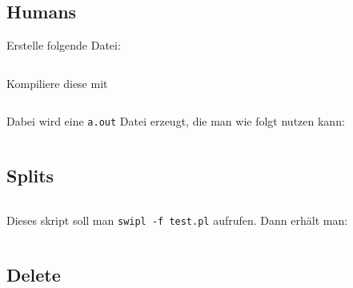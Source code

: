 \subsection{Humans}
Erstelle folgende Datei:
\inputminted[linenos, numbersep=5pt, tabsize=4, frame=lines, label=human.pro]{prolog}{scripts/prolog/human.pro}

Kompiliere diese mit
\inputminted[numbersep=5pt, tabsize=4]{bash}{scripts/prolog/human.sh}

Dabei wird eine \texttt{a.out} Datei erzeugt, die man wie folgt
nutzen kann:
\inputminted[numbersep=5pt, tabsize=4]{bash}{scripts/prolog/human-2.sh}

\subsection{Splits}
\inputminted[linenos, numbersep=5pt, tabsize=4, frame=lines, label=splits.pl]{prolog}{scripts/prolog/splits.pl}

Dieses skript soll man \texttt{swipl -f test.pl} aufrufen. Dann erhält man:

\inputminted[numbersep=5pt, tabsize=4]{prolog}{scripts/prolog/splits.sh}

\subsection{Delete}%
\inputminted[numbersep=5pt, tabsize=4]{prolog}{scripts/prolog/delete.pl}


